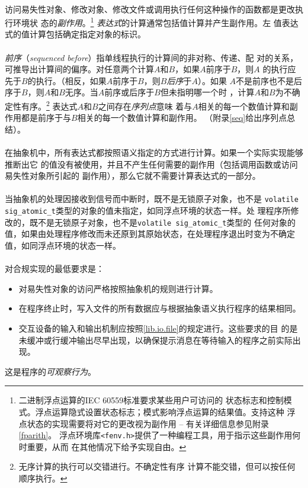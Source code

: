 \paragraph{}
访问易失性对象、修改对象、修改文件或调用执行任何这种操作的函数都是更改执行环境状
态的\textit{副作用}。\footnote{二进制浮点运算的IEC 60559标准要求某些用户可访问的
状态标志和控制模式。浮点运算隐式设置状态标志；模式影响浮点运算的结果值。支持这种
浮点状态的实现需要将对它的更改视为副作用 -- 有关详细信息参见附录\ref{fparith}。
浮点环境库\texttt{<fenv.h>}提供了一种编程工具，用于指示这些副作用何时重要，从而
在其他情况下给予实现自由。} \textit{表达式}的计算通常包括值计算并产生副作用。左
值表达式的值计算包括确定指定对象的标识。

\paragraph{}
\textit{前序}（\textit{sequenced before}）指单线程执行的计算间的非对称、传递、配
对的关系，可推导出计算间的偏序。对任意两个计算$A$和$B$，如果$A$前序于$B$，则$A$
的执行应先于$B$的执行。（相反，如果$A$前序于$B$，则$B$\textit{后序}于$A$）。如果
$A$不是前序也不是后序于$B$，则$A$和$B$无序。当$A$前序或后序于$B$但未指明哪一个时
，计算$A$和$B$为不确定性有序。\footnote{无序计算的执行可以交错进行。不确定性有序
计算不能交错，但可以按任何顺序执行。} 表达式$A$和$B$之间存在\textit{序列点}意味
着与$A$相关的每一个数值计算和副作用都是前序于与$B$相关的每一个数值计算和副作用。
（附录\ref{seq}给出序列点总结）。

\paragraph{}
在抽象机中，所有表达式都按照语义指定的方式进行计算。如果一个实际实现能够推断出它
的值没有被使用，并且不产生任何需要的副作用（包括调用函数或访问易失性对象所引起的
副作用），那么它就不需要计算表达式的一部分。

\paragraph{}
当抽象机的处理因接收到信号而中断时，既不是无锁原子对象，也不是
\texttt{volatile sig\_atomic\_t}类型的对象的值未指定，如同浮点环境的状态一样。处
理程序所修改的，既不是无锁原子对象，也不是\texttt{volatile sig\_atomic\_t}类型的
任何对象的值，如果由处理程序修改而未还原到其原始状态，在处理程序退出时变为不确定
值，如同浮点环境的状态一样。

\paragraph{}
对合规实现的最低要求是：
\begin{itemize}
  \item{对易失性对象的访问严格按照抽象机的规则进行计算。}
  \item{在程序终止时，写入文件的所有数据应与根据抽象语义执行程序的结果相同。}
  \item{交互设备的输入和输出机制应按照\ref{lib.io.file}的规定进行。这些要求的目
  的是未缓冲或行缓冲输出尽早出现，以确保提示消息在等待输入的程序之前实际出现。}
\end{itemize}
这是程序的\textit{可观察行为}。

